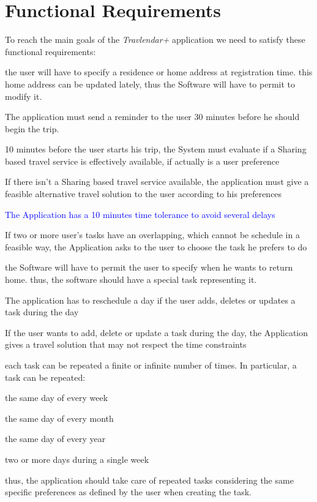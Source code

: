 \section{Functional Requirements}
To reach the main goals of the \emph{Travlendar+} application we need to satisfy these functional requirements:

\begin{requirementList}
	\item the user will have to specify a residence or home address at registration time. this home address can be updated lately, thus the Software will have to permit to modify it. 
   
	\item The application must send a reminder to the user 30 minutes before he should begin the trip.
    
    \item 10 minutes before the user starts his trip, the System must evaluate if a Sharing based travel service is effectively available, if actually is a user preference
    
    \item If there isn't a Sharing based travel service available, the application must give a feasible alternative travel solution to the user according to his preferences
    
    \item \textcolor{blue}{The Application has a 10 minutes time tolerance to avoid several delays} 
    
    \item If two or more user's tasks have an overlapping, which cannot be schedule in a feasible way, the Application asks to the user to choose the task he prefers to do
    
    \item the Software will have to permit the user to specify when he wants to return home. thus, the software should have a special task representing it. 
    
    \item The application has to reschedule a day if the user adds, deletes or updates a task during the day
    
    \item If the user wants to add, delete or update a task during the day, the Application gives a travel solution that may not respect the time constraints
    \item each task can be repeated a finite or infinite number of times. In particular, a task can be repeated:
    \begin{enumerate}[label={[}R 10.\arabic*{]}:]
    \item the same day of every week
    \item the same day of every month
    \item the same day of every year
    \item two or more days during a single week
    \end{enumerate}
    thus, the application should take care of repeated tasks considering the same specific preferences as defined by the user when creating the task.
    

\end{requirementList}
